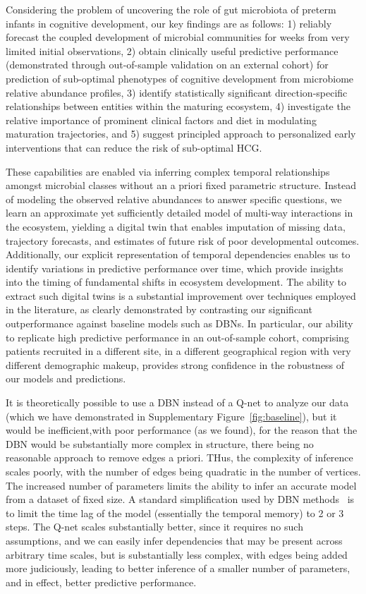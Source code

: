 \documentclass[onecolumn,10pt]{IEEEtran}
\def\qnet{Q-net\xspace}
\def\EXTENDEDDATA{Supplementary\xspace}
\begin{document}
Considering the problem of uncovering the role of gut microbiota of preterm infants in cognitive development, our key findings are as follows: 1) reliably forecast the coupled development of microbial communities for weeks from very limited initial observations, 2) obtain  clinically useful predictive performance (demonstrated through out-of-sample validation on an external cohort) for prediction of sub-optimal phenotypes of cognitive development from microbiome relative abundance profiles, 3)  identify statistically significant direction-specific relationships between entities within the maturing ecosystem, 4) investigate the relative importance of  prominent clinical factors and diet in modulating maturation trajectories, and  5) 
suggest principled approach to personalized early interventions that can reduce the risk of sub-optimal HCG.

These capabilities are enabled via  inferring complex temporal relationships amongst microbial classes without an a priori  fixed parametric structure. Instead of modeling the observed relative abundances to answer specific questions, we learn an approximate yet sufficiently detailed model of multi-way interactions in the ecosystem, yielding a digital twin that enables imputation of missing data, trajectory forecasts, and estimates of future risk of poor developmental outcomes. Additionally,  our explicit representation of temporal dependencies enables us to identify variations in predictive performance over time, which  provide insights into the timing of fundamental shifts in ecosystem development. The ability to extract such digital twins is a substantial improvement over techniques employed in the literature, as clearly demonstrated by contrasting our significant outperformance against  baseline models such as DBNs.  In particular, our ability to replicate high predictive performance in an out-of-sample cohort, comprising patients recruited in a different site, in a different geographical region with very different  demographic makeup, provides strong confidence in the robustness of our models and predictions.

It is  theoretically possible to use a DBN instead of a \qnet to analyze our data (which we have demonstrated in \EXTENDEDDATA Figure~\ref{fig:baseline}), but it would be inefficient,with poor performance (as we found), for the reason that the DBN would be substantially more complex in structure, there being no reasonable approach to  remove edges a priori.
THus, the complexity of inference scales poorly, with the number of edges being quadratic in the number of vertices.  The increased number of parameters  limits the ability to infer an accurate model from a dataset of fixed size. A standard simplification used by DBN methods~\cite{ lugo2019dynamic} is to  limit the time lag of the model (essentially the temporal memory) to 2 or 3 steps. The \qnet scales substantially better, since it requires no such assumptions, and we can easily infer dependencies that may be present across arbitrary time scales, but  is substantially less complex, with edges being added more judiciously, leading to better inference of a smaller number of parameters, and in effect, better predictive performance.
\end{document}
